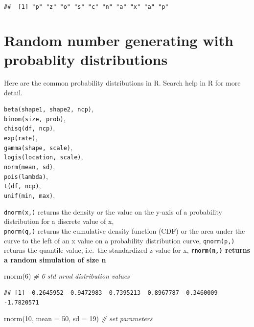 \documentclass[
]{book}
\newenvironment{Shaded}{\begin{snugshade}}{\end{snugshade}}
\newcommand{\AttributeTok}[1]{\textcolor[rgb]{0.77,0.63,0.00}{#1}}
\newcommand{\CommentTok}[1]{\textcolor[rgb]{0.56,0.35,0.01}{\textit{#1}}}
\newcommand{\DecValTok}[1]{\textcolor[rgb]{0.00,0.00,0.81}{#1}}
\newcommand{\FunctionTok}[1]{\textcolor[rgb]{0.00,0.00,0.00}{#1}}
\newcommand{\NormalTok}[1]{#1}
\theoremstyle{definition}
\theoremstyle{definition}
\theoremstyle{definition}
\theoremstyle{definition}
\theoremstyle{remark}
\begin{document}
\begin{verbatim}
##  [1] "p" "z" "o" "s" "c" "n" "a" "x" "a" "p"
\end{verbatim}

\hypertarget{random-number-generating-with-probablity-distributions}{%
\section{Random number generating with probablity distributions}\label{random-number-generating-with-probablity-distributions}}

Here are the common probability distributions in R. Search help in R for more detail.

\texttt{beta(shape1,\ shape2,\ ncp)},\\
\texttt{binom(size,\ prob)},\\
\texttt{chisq(df,\ ncp)},\\
\texttt{exp(rate)},\\
\texttt{gamma(shape,\ scale)},\\
\texttt{logis(location,\ scale)},\\
\texttt{norm(mean,\ sd)},\\
\texttt{pois(lambda)},\\
\texttt{t(df,\ ncp)},\\
\texttt{unif(min,\ max)},

\texttt{dnorm(x,)} returns the density or the value on the y-axis of a probability distribution for a discrete value of x,\\
\texttt{pnorm(q,)} returns the cumulative density function (CDF) or the area under the curve to the left of an x value on a probability distribution curve,
\texttt{qnorm(p,)} returns the quantile value, i.e.~the standardized z value for x,
\textbf{\texttt{rnorm(n,)} returns a random simulation of size n}

\begin{Shaded}
\begin{Highlighting}[]
\FunctionTok{rnorm}\NormalTok{(}\DecValTok{6}\NormalTok{) }\CommentTok{\#  6 std nrml distribution values}
\end{Highlighting}
\end{Shaded}

\begin{verbatim}
## [1] -0.2645952 -0.9472983  0.7395213  0.8967787 -0.3460009 -1.7820571
\end{verbatim}

\begin{Shaded}
\begin{Highlighting}[]
\FunctionTok{rnorm}\NormalTok{(}\DecValTok{10}\NormalTok{, }\AttributeTok{mean =} \DecValTok{50}\NormalTok{, }\AttributeTok{sd =} \DecValTok{19}\NormalTok{) }\CommentTok{\# set parameters}
\end{Highlighting}
\end{Shaded}
\end{document}
